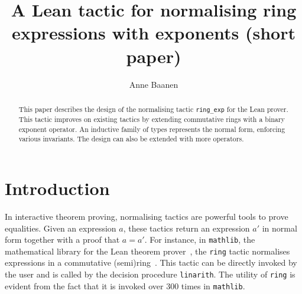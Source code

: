 \documentclass{llncs}
\title{A Lean tactic for normalising ring\\ expressions with exponents (short paper)}
\author{Anne Baanen}
\institute{Vrije Universiteit Amsterdam, Amsterdam, The Netherlands\\\email{t.baanen@vu.nl}}
\newcommand{\lean}[1]{\texttt{#1}\xspace} %
\newcommand{\mathlib}{\texttt{mathlib}\xspace}
\newcommand{\ring}{\lean{ring}}
\newcommand{\ringexp}{\lean{ring\_exp}}
\begin{document}
\maketitle

\begin{abstract}
This paper describes the design of the normalising tactic \ringexp for the Lean prover.
This tactic improves on existing tactics by extending commutative rings with a binary exponent operator.
An inductive family of types represents the normal form, enforcing various invariants.
The design can also be extended with more operators.
\end{abstract}

\section{Introduction}

In interactive theorem proving, normalising tactics are powerful tools to prove equalities.
Given an expression $a$, these tactics return an expression $a'$ in normal form together with a proof that $a = a'$.
For instance, in \mathlib, the mathematical library for the Lean theorem prover~\cite{lean-prover},
the \ring tactic normalises %
expressions in a commutative (semi)ring~\cite{mathlib}.
This tactic can be directly invoked by the user
and is called by the decision procedure \lean{linarith}.
The utility of \ring is evident from the fact that it is invoked over 300 times in \mathlib.
\end{document}
